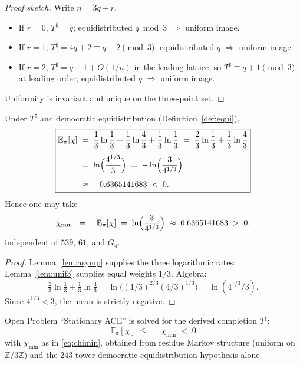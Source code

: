 \begin{proof}[Proof sketch]
Write \(n=3q+r\).
\begin{itemize}
  \item If \(r=0\), \(T^\sharp=q\); equidistributed \(q\bmod 3\) \(\Rightarrow\)
        uniform image.
  \item If \(r=1\), \(T^\sharp=4q+2\equiv q+2\pmod{3}\); equidistributed \(q\)
        \(\Rightarrow\) uniform image.
  \item If \(r=2\), \(T^\sharp=q+1+O(1/n)\) in the leading lattice, so
        \(T^\sharp\equiv q+1\pmod{3}\) at leading order; equidistributed \(q\)
        \(\Rightarrow\) uniform image.
\end{itemize}
Uniformity is invariant and unique on the three-point set.
\end{proof}

\begin{theorem}
\label{thm:stationary-ACE}
Under \(T^\sharp\) and democratic equidistribution
(Definition~\ref{def:equi}),
\begin{equation}
\boxed{
\begin{aligned}
\mathbb{E}_\pi[\chi]
&\;=\;
\frac13\ln\frac13
+\frac13\ln\frac43
+\frac13\ln\frac13
\;=\;
\frac23\ln\frac13
+\frac13\ln\frac43
\\[4pt]
&\;=\;
\ln\Bigl(\frac{4^{1/3}}{3}\Bigr)
\;=\;
-\ln\Bigl(\frac{3}{4^{1/3}}\Bigr)
\\[4pt]
&\;\approx\;
-0.6365141683
\;<\;0.
\end{aligned}
}
\label{eq:Epi}
\end{equation}
Hence one may take
\begin{equation}
\label{eq:chimin}
\chi_{\min}
\;:=\;
-\mathbb{E}_\pi[\chi]
\;=\;
\ln\Bigl(\frac{3}{4^{1/3}}\Bigr)
\;\approx\;
0.6365141683
\;>\;0,
\end{equation}
independent of \(539\), \(61\), and \(G_4\).
\end{theorem}

\begin{proof}
Lemma~\ref{lem:asymp} supplies the three logarithmic rates; Lemma~\ref{lem:unif3}
supplies equal weights \(1/3\). Algebra:
\[
\tfrac23\ln\tfrac13+\tfrac13\ln\tfrac43
=\ln\bigl((1/3)^{2/3}(4/3)^{1/3}\bigr)
=\ln(4^{1/3}/3).
\]
Since \(4^{1/3}<3\), the mean is strictly negative.
\end{proof}

\begin{corollary}
\label{cor:ACE-done}
Open Problem ``Stationary ACE'' is solved for the derived completion
\(T^\sharp\): 
\[
\mathbb{E}_\pi[\chi]
\;\le\;
-\chi_{\min}
\;<\;0
\]
with \(\chi_{\min}\) as in \eqref{eq:chimin}, obtained from residue Markov
structure (uniform on \(\mathbb{Z}/3\mathbb{Z}\)) and the \(243\)-tower
democratic equidistribution hypothesis alone.
\end{corollary}


